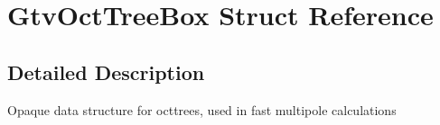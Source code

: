 \section{GtvOctTreeBox Struct Reference}
\label{structGtvOctTreeBox}


\subsection{Detailed Description}
Opaque data structure for octtrees, used in fast multipole calculations 

